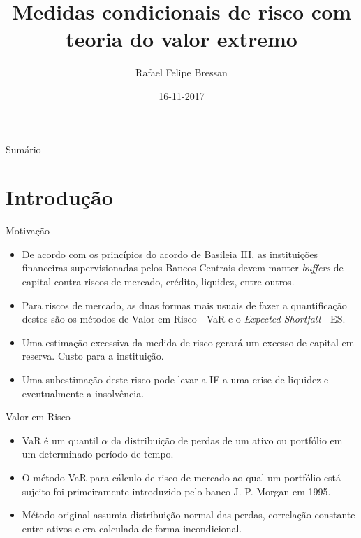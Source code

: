 \documentclass[ignorenonframetext,]{beamer}
\title{Medidas condicionais de risco com teoria do valor extremo}
\author{Rafael Felipe Bressan}
\date{16-11-2017}
\providecommand{\tightlist}{%
\setlength{\itemsep}{0pt}\setlength{\parskip}{0pt}}
\begin{document}
\frame{\titlepage}

\section[]{}
\begin{frame}{Sumário}
  \tableofcontents
\end{frame}

\section{Introdução}\label{introducao}

\begin{frame}{Motivação}

\begin{itemize}
\tightlist
\item
  De acordo com os princípios do acordo de Basileia III, as instituições
  financeiras supervisionadas pelos Bancos Centrais devem manter
  \emph{buffers} de capital contra riscos de mercado, crédito, liquidez,
  entre outros.
\item
  Para riscos de mercado, as duas formas mais usuais de fazer a
  quantificação destes são os métodos de Valor em Risco - VaR e o
  \emph{Expected Shortfall} - ES.
\item
  Uma estimação excessiva da medida de risco gerará um excesso de
  capital em reserva. Custo para a instituição.
\item
  Uma subestimação deste risco pode levar a IF a uma crise de liquidez e
  eventualmente a insolvência.
\end{itemize}

\end{frame}

\begin{frame}{Valor em Risco}

\begin{itemize}
\tightlist
\item
  VaR é um quantil \(\alpha\) da distribuição de perdas de um ativo ou
  portfólio em um determinado período de tempo.
\item
  O método VaR para cálculo de risco de mercado ao qual um portfólio
  está sujeito foi primeiramente introduzido pelo banco J. P. Morgan em
  1995.
\item
  Método original assumia distribuição normal das perdas, correlação
  constante entre ativos e era calculada de forma incondicional.
\end{itemize}

\end{frame}
\end{document}

